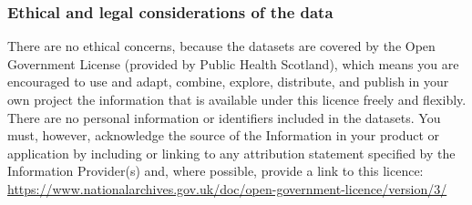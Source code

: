 \documentclass[
]{article}
\begin{document}
\hypertarget{ethical-and-legal-considerations-of-the-data}{%
\subsubsection{Ethical and legal considerations of the
data}\label{ethical-and-legal-considerations-of-the-data}}

There are no ethical concerns, because the datasets are covered by the
Open Government License (provided by Public Health Scotland), which
means you are encouraged to use and adapt, combine, explore, distribute,
and publish in your own project the information that is available under
this licence freely and flexibly. There are no personal information or
identifiers included in the datasets. You must, however, acknowledge the
source of the Information in your product or application by including or
linking to any attribution statement specified by the Information
Provider(s) and, where possible, provide a link to this licence:
\url{https://www.nationalarchives.gov.uk/doc/open-government-licence/version/3/}
\end{document}
